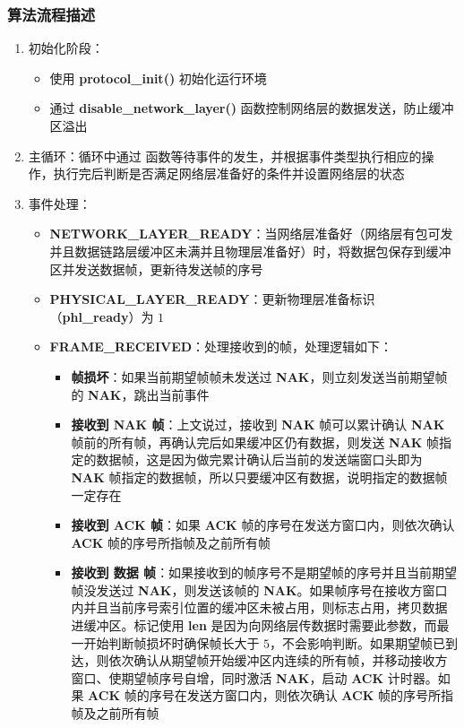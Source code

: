         \subsubsection{算法流程描述}
            \begin{enumerate}
                \item 初始化阶段：
                    \begin{itemize}
                        \item 使用 \textbf{protocol_init()} 初始化运行环境
                        \item 通过 \textbf{disable_network_layer()} 函数控制网络层的数据发送，防止缓冲区溢出
                    \end{itemize}
                \item 主循环：循环中通过  函数等待事件的发生，并根据事件类型执行相应的操作，执行完后判断是否满足网络层准备好的条件并设置网络层的状态
                \item 事件处理：
                    \begin{itemize}
                        \item \textbf{NETWORK_LAYER_READY}：当网络层准备好（网络层有包可发并且数据链路层缓冲区未满并且物理层准备好）时，将数据包保存到缓冲区并发送数据帧，更新待发送帧的序号
                        \item \textbf{PHYSICAL_LAYER_READY}：更新物理层准备标识（\textbf{phl_ready}）为 $1$
                        \item \textbf{FRAME_RECEIVED}：处理接收到的帧，处理逻辑如下：
                            \begin{itemize}
                                \item \textbf{帧损坏}：如果当前期望帧帧未发送过 \textbf{NAK}，则立刻发送当前期望帧的 \textbf{NAK}，跳出当前事件
                                \item \textbf{接收到 NAK 帧}：上文说过，接收到 \textbf{NAK} 帧可以累计确认 \textbf{NAK} 帧前的所有帧，再确认完后如果缓冲区仍有数据，则发送 \textbf{NAK} 帧指定的数据帧，这是因为做完累计确认后当前的发送端窗口头即为 \textbf{NAK} 帧指定的数据帧，所以只要缓冲区有数据，说明指定的数据帧一定存在
                                \item \textbf{接收到 ACK 帧}：如果 \textbf{ACK} 帧的序号在发送方窗口内，则依次确认 \textbf{ACK} 帧的序号所指帧及之前所有帧
                                \item \textbf{接收到 数据 帧}：如果接收到的帧序号不是期望帧的序号并且当前期望帧没发送过 \textbf{NAK}，则发送该帧的 \textbf{NAK}。如果帧序号在接收方窗口内并且当前序号索引位置的缓冲区未被占用，则标志占用，拷贝数据进缓冲区。标记使用 \textbf{len} 是因为向网络层传数据时需要此参数，而最一开始判断帧损坏时确保帧长大于 $5$，不会影响判断。如果期望帧已到达，则依次确认从期望帧开始缓冲区内连续的所有帧，并移动接收方窗口、使期望帧序号自增，同时激活 \textbf{NAK}，启动 \textbf{ACK} 计时器。如果 \textbf{ACK} 帧的序号在发送方窗口内，则依次确认 \textbf{ACK} 帧的序号所指帧及之前所有帧

\end{itemize}
\end{itemize}
\end{enumerate}
